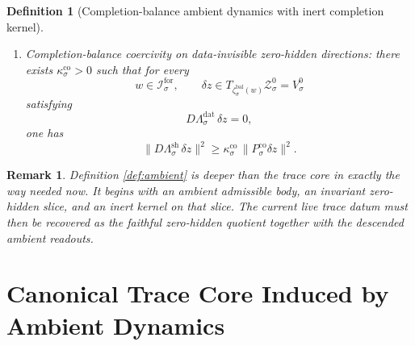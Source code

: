 \documentclass[11pt]{article}
\newcommand{\ForSpace}[1]{\mathcal I_{#1}^{\mathrm{for}}}
\newcommand{\BalData}[1]{\Lambda_{#1}^{\mathrm{dat}}}
\newcommand{\BalShell}[1]{\Lambda_{#1}^{\mathrm{sh}}}
\newcommand{\ZeroHiddenSlice}[1]{\mathcal Z_{#1}^{0}}
\newcommand{\ZeroHiddenVec}[1]{V_{#1}^{0}}
\newcommand{\Kernel}[1]{K_{#1}^{0}}
\newcommand{\BalEmbed}[1]{\zeta_{#1}^{\mathrm{bal}}}
\newcommand{\StateComp}[1]{P_{#1}^{\mathrm{co}}}
\newtheorem{definition}{Definition}
\newtheorem{remark}{Remark}
\begin{document}
\begin{definition}[Completion-balance ambient dynamics with inert completion kernel]
\begin{enumerate}
\[    \cap
    \ker\bigl(D\BalShell{\sigma}\big|_{\ZeroHiddenVec{\sigma}}\bigr)
    \]
    and the orthogonal completion-state projector
    \[
    \StateComp{\sigma}:\ZeroHiddenVec{\sigma}\to{\Kernel{\sigma}}^{\perp}\cap\ZeroHiddenVec{\sigma}.
    \]
    \item Completion-balance coercivity on data-invisible zero-hidden directions: there exists \(\kappa_{\sigma}^{\mathrm{co}}>0\) such that for every
    \[
    w\in\ForSpace{\sigma},
    \qquad
    \delta z\in T_{\BalEmbed{\sigma}(w)}\ZeroHiddenSlice{\sigma}=\ZeroHiddenVec{\sigma}
    \]
    satisfying
    \[
    D\BalData{\sigma}\,\delta z=0,
    \]
    one has
    \begin{equation}
    \|D\BalShell{\sigma}\,\delta z\|^{2}
    \ge
    \kappa_{\sigma}^{\mathrm{co}}\,
    \|\StateComp{\sigma}\delta z\|^{2}.
    \label{eq:ambientcoercive}
    \end{equation}
\end{enumerate}
\end{definition}

\begin{remark}
Definition \ref{def:ambient} is deeper than the trace core in exactly the way needed now. It begins with an ambient admissible body, an invariant zero-hidden slice, and an inert kernel on that slice. The current live trace datum must then be recovered as the faithful zero-hidden quotient together with the descended ambient readouts.
\end{remark}

\section{Canonical Trace Core Induced by Ambient Dynamics}
\end{document}

